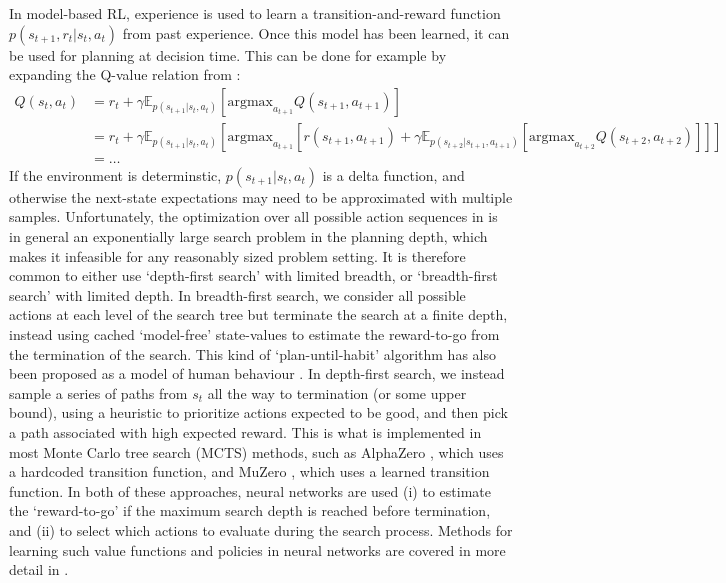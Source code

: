 In model-based RL, experience is used to learn a transition-and-reward function $p(s_{t+1}, r_t | s_t, a_t)$ from past experience.
Once this model has been learned, it can be used for planning at decision time.
This can be done for example by expanding the Q-value relation from :
{\small
\begin{align}
    \label{eq:Q-search}
    Q(s_t,a_t) &=  r_t + \gamma \mathbb{E}_{p(s_{t+1} | s_t, a_t)} \left [ \text{argmax}_{a_{t+1}} Q(s_{t+1}, a_{t+1}) \right ]\\
    &= r_t + \gamma \mathbb{E}_{p(s_{t+1} | s_t, a_t)} \left [ \text{argmax}_{a_{t+1}}
    \left [ r(s_{t+1}, a_{t+1}) + \gamma \mathbb{E}_{p(s_{t+2} | s_{t+1}, a_{t+1})} \left [ \text{argmax}_{a_{t+2}} Q(s_{t+2}, a_{t+2}) \right ] \right ] \right ] \\
    &= \ldots
\end{align}
}
If the environment is determinstic, $p(s_{t+1} | s_t, a_t)$ is a delta function, and otherwise the next-state expectations may need to be approximated with multiple samples.
Unfortunately, the optimization over all possible action sequences in  is in general an exponentially large search problem in the planning depth, which makes it infeasible for any reasonably sized problem setting.
It is therefore common to either use `depth-first search' with limited breadth, or `breadth-first search' with limited depth.
In breadth-first search, we consider all possible actions at each level of the search tree but terminate the search at a finite depth, instead using cached `model-free' state-values to estimate the reward-to-go from the termination of the search.
This kind of `plan-until-habit' algorithm has also been proposed as a model of human behaviour \citep{keramati2016adaptive}.
In depth-first search, we instead sample a series of paths from $s_t$ all the way to termination (or some upper bound), using a heuristic to prioritize actions expected to be good, and then pick a path associated with high expected reward.
This is what is implemented in most Monte Carlo tree search (MCTS) methods, such as AlphaZero \citep{silver2018general}, which uses a hardcoded transition function, and MuZero \citep{schrittwieser2020mastering}, which uses a learned transition function.
In both of these approaches, neural networks are used (i) to estimate the `reward-to-go' if the maximum search depth is reached before termination, and (ii) to select which actions to evaluate during the search process.
Methods for learning such value functions and policies in neural networks are covered in more detail in .

